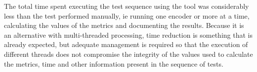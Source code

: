 \documentclass{acm_proc_article-sp}
\begin{document}
The total time spent executing the test sequence using the tool was considerably less than the test performed manually, ie running one encoder or more at a time, calculating the values of the metrics and documenting the results. Because it is an alternative with multi-threaded processing, time reduction is something that is already expected, but adequate management is required so that the execution of different threads does not compromise the integrity of the values used to calculate the metrics, time and other information present in the sequence of tests.







\end{document}
